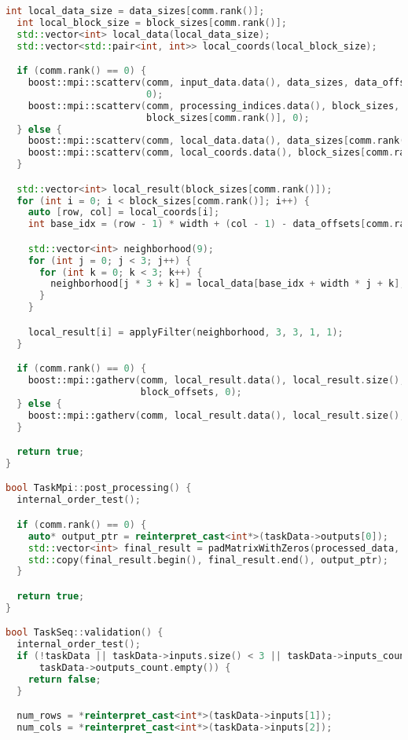 \documentclass[14pt]{extarticle}
\theoremstyle{definition}
\theoremstyle{remark}
\begin{document}
\begin{lstlisting}[language=C++, caption=Приложение №1]
  int local_data_size = data_sizes[comm.rank()];
  int local_block_size = block_sizes[comm.rank()];
  std::vector<int> local_data(local_data_size);
  std::vector<std::pair<int, int>> local_coords(local_block_size);

  if (comm.rank() == 0) {
    boost::mpi::scatterv(comm, input_data.data(), data_sizes, data_offsets, local_data.data(), data_sizes[comm.rank()],
                         0);
    boost::mpi::scatterv(comm, processing_indices.data(), block_sizes, block_offsets, local_coords.data(),
                         block_sizes[comm.rank()], 0);
  } else {
    boost::mpi::scatterv(comm, local_data.data(), data_sizes[comm.rank()], 0);
    boost::mpi::scatterv(comm, local_coords.data(), block_sizes[comm.rank()], 0);
  }

  std::vector<int> local_result(block_sizes[comm.rank()]);
  for (int i = 0; i < block_sizes[comm.rank()]; i++) {
    auto [row, col] = local_coords[i];
    int base_idx = (row - 1) * width + (col - 1) - data_offsets[comm.rank()];

    std::vector<int> neighborhood(9);
    for (int j = 0; j < 3; j++) {
      for (int k = 0; k < 3; k++) {
        neighborhood[j * 3 + k] = local_data[base_idx + width * j + k];
      }
    }

    local_result[i] = applyFilter(neighborhood, 3, 3, 1, 1);
  }

  if (comm.rank() == 0) {
    boost::mpi::gatherv(comm, local_result.data(), local_result.size(), processed_data.data(), block_sizes,
                        block_offsets, 0);
  } else {
    boost::mpi::gatherv(comm, local_result.data(), local_result.size(), 0);
  }

  return true;
}

bool TaskMpi::post_processing() {
  internal_order_test();

  if (comm.rank() == 0) {
    auto* output_ptr = reinterpret_cast<int*>(taskData->outputs[0]);
    std::vector<int> final_result = padMatrixWithZeros(processed_data, height, width);
    std::copy(final_result.begin(), final_result.end(), output_ptr);
  }

  return true;
}

bool TaskSeq::validation() {
  internal_order_test();
  if (!taskData || taskData->inputs.size() < 3 || taskData->inputs_count.size() < 3 || taskData->outputs.empty() ||
      taskData->outputs_count.empty()) {
    return false;
  }

  num_rows = *reinterpret_cast<int*>(taskData->inputs[1]);
  num_cols = *reinterpret_cast<int*>(taskData->inputs[2]);


\end{lstlisting}
\end{document}
